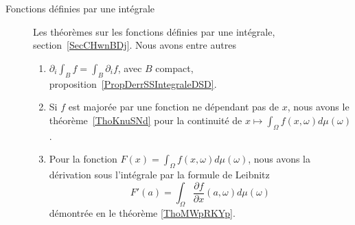 \begin{description}
    \item[Fonctions définies par une intégrale]
        Les théorèmes sur les fonctions définies par une intégrale, section~\ref{SecCHwnBDj}. Nous avons entre autres
        \begin{enumerate}
            \item
                \( \partial_i\int_Bf=\int_B\partial_if\), avec \( B\) compact, proposition~\ref{PropDerrSSIntegraleDSD}.
            \item
                Si \( f\) est majorée par une fonction ne dépendant pas de \( x\), nous avons le théorème~\ref{ThoKnuSNd} pour la continuité de \( x\mapsto \int_{\Omega}f(x,\omega)d\mu(\omega)\).
            \item
                Pour la fonction $F(x)=\int_{\Omega}f(x,\omega)d\mu(\omega)$, nous avons la dérivation sous l'intégrale par la formule de Leibnitz
                \begin{equation}
                    F'(a)=\int_{\Omega}\frac{ \partial f }{ \partial x }(a,\omega)d\mu(\omega)
                \end{equation}
                démontrée en le théorème \ref{ThoMWpRKYp}.


\end{enumerate}
\end{description}
